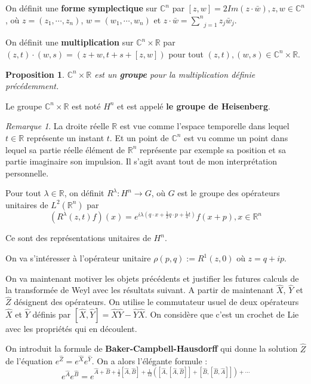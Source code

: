 \documentclass[a4paper, 12pt]{report}
\newcommand{\R}{\mathbb{R}} %
\newcommand{\ra}[1][]{\overset{#1}{\rightarrow}} %
\renewcommand{\.}{\cdot} %
\theoremstyle{break}
\newtheorem{proposition}{Proposition}
\theoremstyle{remark}
\newtheorem{remark}{Remarque}
\theoremstyle{proofstyle}
\begin{document}
On définit une \textbf{forme symplectique} sur $\mathbb{C}^n$ par $[z, w] = 2 Im(z \. \bar{w}), z, w \in \mathbb{C}^n$, où $z = (z_1, \cdots, z_n)$, $w = (w_1, \cdots, w_n)$ et $z \. \bar{w} = \underset{j=1}{\overset{n}{\sum}} z_j \bar{w}_j$.

On définit une \textbf{multiplication} sur $\mathbb{C}^n \times \R$ par $(z,t) \. (w, s) = (z+w, t+s + [z,w])$ pour tout $(z,t), (w,s) \in \mathbb{C}^n \times \R$.

\begin{proposition}
    $\mathbb{C}^n \times \R$ est un \textbf{groupe} pour la multiplication définie précédemment.
\end{proposition}

Le groupe $\mathbb{C}^n \times \R$ est noté $H^n$ et est appelé \textbf{le groupe de Heisenberg}.\vspace{5pt}

\begin{remark}
    La droite réelle $\R$ est vue comme l'espace temporelle dans lequel $t \in \R$ représente un instant $t$. Et un point de $\mathbb{C}^n$ est vu comme un point dans lequel sa partie réelle élément de $\R^n$ représente par exemple sa position et sa partie imaginaire son impulsion. Il s'agit avant tout de mon interprétation personnelle.
\end{remark}

Pour tout $\lambda \in \R$, on définit $R^\lambda : H^n \ra G$, où $G$ est le groupe des opérateurs unitaires de $L^2(\R^n)$ par
$$(R^\lambda(z,t)f)(x) = e^{i \lambda (q\. x + \frac{1}{2} q \. p+ \frac{1}{4}t)}f(x+p), x \in \mathbb{R}^n$$\vspace{5pt}

Ce sont des représentations unitaires de $H^n$.\vspace{5pt}

On va s'intéresser à l'opérateur unitaire $\rho(p,q) := R^1(z,0)$ où $z=q+ip$. \vspace{10pt}

On va maintenant motiver les objets précédents et justifier les futures calculs de la transformée de Weyl avec les résultats suivant. A partir de maintenant $\hat{X}$, $\hat{Y}$ et $\hat{Z}$ désignent des opérateurs. On utilise le commutateur usuel de deux opérateurs $\hat{X}$ et $\hat{Y}$ définis par $[\hat{X},\hat{Y}] = \hat{X}\hat{Y}-\hat{Y}\hat{X}$. On considère que c'est un crochet de Lie avec les propriétés qui en découlent.\vspace{5pt}

On introduit la formule de \textbf{Baker-Campbell-Hausdorff} qui donne la solution $\hat{Z}$ de l'équation $e^{\hat{Z}} = e^{\hat{X}} e^{\hat{Y}}$. On a alors l'élégante formule :
$$e^{\hat{A}} e^{\hat{B}} = e^{\hat{A}+\hat{B}+\frac{1}{2} [\hat{A},\hat{B}] + \frac{1}{12} ([\hat{A}, [\hat{A},\hat{B}]] + [\hat{B},[\hat{B},\hat{A}]])+\cdots}$$
\end{document}
